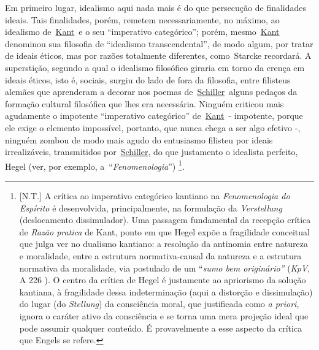 Em primeiro lugar, idealismo aqui nada mais é do que persecução de
finalidades ideais. Tais finalidades, porém, remetem necessariamente, no
máximo, ao idealismo
de~\href{https://www.marxists.org/portugues/dicionario/verbetes/k/kant.htm}{Kant}~e
o seu ``imperativo categórico''; porém,
mesmo~\href{https://www.marxists.org/portugues/dicionario/verbetes/k/kant.htm}{Kant}~
denominou sua filosofia de ``idealismo transcendental'', de modo algum,
por tratar de ideais éticos, mas por razões totalmente diferentes,
como~Starcke recordará. A superstição, segundo a qual o idealismo
filosófico giraria em torno da crença em ideais éticos, isto é, sociais,
surgiu do lado de fora da filosofia, entre filisteus alemães que
aprenderam a decorar nos poemas
de~\href{https://www.marxists.org/portugues/dicionario/verbetes/s/schiller_friedrich.htm}{Schiller}~alguns
pedaços da formação cultural filosófica que lhes era necessária. Ninguém
criticou mais agudamente o impotente ``imperativo categórico''
de~\href{https://www.marxists.org/portugues/dicionario/verbetes/k/kant.htm}{Kant}~-
impotente, porque ele exige o elemento impossível, portanto, que nunca
chega a ser algo efetivo -, ninguém zombou de modo mais agudo do
entusiasmo filisteu por ideais irrealizáveis, transmitidos
por~\href{https://www.marxists.org/portugues/dicionario/verbetes/s/schiller_friedrich.htm}{Schiller},
do que justamento o idealista perfeito, Hegel (ver, por exemplo,
a~``\emph{Fenomenologia}'') \footnote{{[}N.T.{]} A crítica ao imperativo
  categórico kantiano na \emph{Fenomenologia do Espírito} é
  desenvolvida, principalmente, na formulação da \emph{Verstellung}
  (deslocamento dissimulador). Uma passagem fundamental da recepção
  crítica de \emph{Razão pratica} de Kant, ponto em que Hegel expõe a
  fragilidade conceitual que julga ver no dualismo kantiano: a resolução
  da antinomia entre natureza e moralidade, entre a estrutura
  normativa-causal da natureza e a estrutura normativa da moralidade,
  via postulado de um ``\emph{sumo bem originário''} (\emph{KpV}, A 226
  ). O centro da crítica de Hegel é justamente ao apriorismo da solução
  kantiana, à fragilidade dessa indeterminação (aqui a distorção e
  dissimulação) do lugar (do \emph{Stellung}) da consciência moral, que
  justificada como \emph{a priori}, ignora o caráter ativo da
  consciência e se torna uma mera projeção ideal que pode assumir
  qualquer conteúdo. É provavelmente a esse aspecto da crítica que
  Engels se refere.}\emph{.} \protect\hypertarget{r16}{}{}

